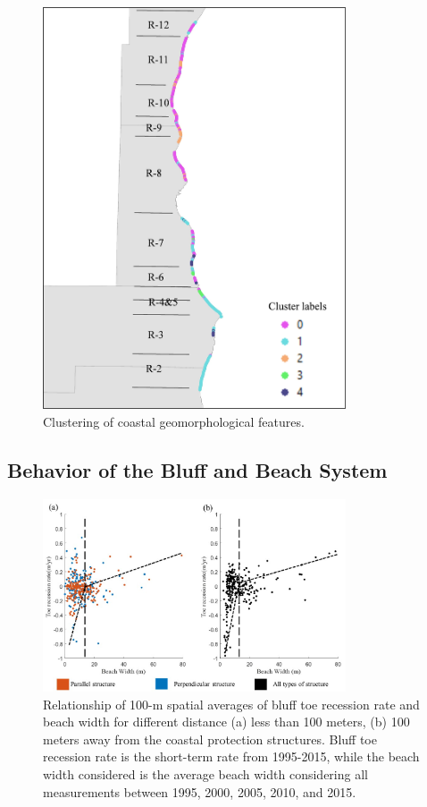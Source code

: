 \begin{figure}[htbp] \centering
\includegraphics[width=0.8\textwidth]{chapter2/resources/figure2-9.jpg}
\caption{Clustering of coastal geomorphological features.} 
\label{fig:fig2.9}
\end{figure}

\subsection{Behavior of the Bluff and Beach System} 
\label{Behavior of the Bluff and Beach System} 

\begin{figure}[htbp] \centering
\includegraphics[width=0.8\textwidth]{chapter2/resources/figure2-10.jpg}
\caption{Relationship of 100-m spatial averages of bluff toe recession rate and
beach width for different distance (a) less than 100 meters, (b) 100 meters away
from the coastal protection structures. Bluff toe recession rate is the
short-term rate from 1995-2015, while the beach width considered is the average
beach width considering all measurements between 1995, 2000, 2005, 2010, and
2015. } 
\label{fig:fig2.10} 
\end{figure} 

